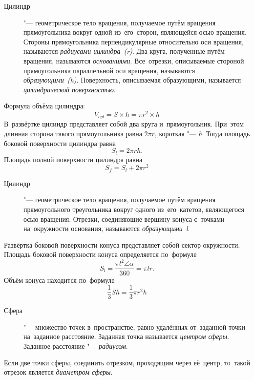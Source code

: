\documentclass[]{scrartcl}
\begin{document}
\begin{description}
	\item[Цилиндр] "--- геометрическое тело вращения, получаемое путём вращения прямоугольника вокруг одной из~его~сторон, являющейся осью вращения. Стороны прямоугольника перпендикулярные относительно оси вращения, называются \emph{радиусами цилиндра~(\textit{r})}. Два круга, полученные  путём вращения, называются \emph{основаниями}. Все~отрезки, описываемые стороной прямоугольника параллельной оси вращения, называются \emph{образующими~(\textit{h})}. Поверхность, описываемая образующими, называется \emph{цилиндрической поверхностью}.
\end{description}
Формула объёма цилиндра:
\begin{equation}\label{eq:cylinder-volume}
V_{cyl}=S\times h = \pi r^2 \times h
\end{equation}
В~развёртке цилиндр представляет собой два круга и~прямоугольник. При~этом длинная сторона такого прямоугольника равна ${\textstyle 2\pi r}$, короткая "--- \textit{h}. Тогда площадь боковой поверхности цилиндра равна
\begin{equation}\label{eq:cyl-lateral-surface-square}
S_{l}= 2 \pi rh.
\end{equation}
Площадь полной поверхности цилиндра равна
\begin{equation}\label{eq:cyl-full-surface-square}
S_{f}=S_{l}+2 \pi r^2
\end{equation}

\begin{description}
	\item[Цилиндр] "--- геометрическое тело вращения, получаемое путём вращения прямоугольного треугольника вокруг одного из~его~катетов, являющегося осью вращения. Отрезки, соединяющие вершину конуса с~точками на~окружности основания, называются \emph{образующими~{\textit{l}}}.
\end{description}
Развёртка боковой поверхности конуса представляет собой сектор окружности. Площадь боковой поверхности конуса определяется по~формуле
\begin{equation}\label{eq:conus-lateral-surface-square}
S_{l}=\frac{\pi l^2 \angle \alpha}{360} = \pi l r.
\end{equation}
Объём конуса находится по~формуле
\begin{equation}\label{eq:cyl-volume}
\frac{1}{3}Sh=\frac{1}{3}\pi r^2 h
\end{equation}

\begin{description}
	\item[Сфера] "--- множество точек в~пространстве, равно удалённых от~заданной точки на~заданное расстояние. Заданная точка называется \emph{центром сферы}. Заданное расстояние "--- \emph{радиусом}.
\end{description}
Если две точки сферы, соединить отрезком, проходящим через её~центр, то~такой отрезок является \emph{диаметром сферы}.
\end{document}
